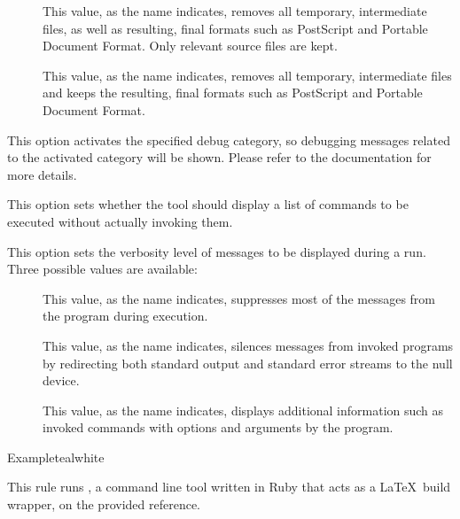 \begin{description}
\begin{description}
\begin{description}
\item[] This value, as the name indicates, removes all temporary, intermediate files, as well as resulting, final formats such as PostScript and Portable Document Format. Only relevant source files are kept.

\item[] This value, as the name indicates, removes all temporary, intermediate files and keeps the resulting, final formats such as PostScript and Portable Document Format.
\end{description}

\item[\abox{debug}] This option activates the specified debug category, so debugging messages related to the activated category will be shown. Please refer to the documentation for more details.

\item[\rpsbox{dry}] This option sets whether the tool should display a list of commands to be executed without actually invoking them.

\item[\abox{mode}]
This option sets the verbosity level of messages to be displayed during a run. Three possible values are available:

\begin{description}
\item[] This value, as the name indicates, suppresses most of the messages from the program during execution.

\item[] This value, as the name indicates, silences messages from invoked programs by redirecting both standard output and standard error streams to the null device.

\item[] This value, as the name indicates, displays additional information such as invoked commands with options and arguments by the program.
\end{description}
\end{description}

\begin{codebox}{Example}{teal}{\icnote}{white}
\end{codebox}

\item[\rulebox{ltx2any}]
This rule runs , a command line tool written in Ruby that acts as a \LaTeX\ build wrapper, on the provided  reference.


\end{description}
